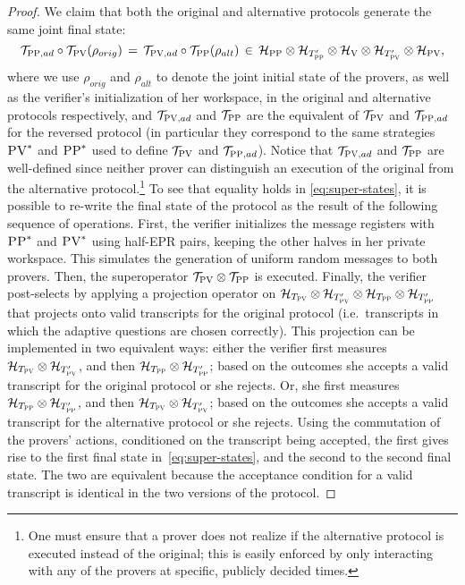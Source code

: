 \documentclass[11pt]{article}
\theoremstyle{remark}
\theoremstyle{definition}
\newcommand{\mH}{\mathcal{H}}
\newcommand{\mT}{\mathcal{T}}
\newcommand{\ver}{\textsc{V}}
\newcommand{\pv}{\textsc{PV}}
\newcommand{\pp}{\textsc{PP}}
\begin{document}
\begin{proof}
We claim that both the original and alternative protocols generate the same joint final state:
\begin{equation}\label{eq:super-states}
\mT_{\pp,ad}\circ\mT_\pv(\rho_{orig}) \,=\, \mT_{\pv,ad}\circ \mT_\pp(\rho_{alt}) \,\in\,  \mH_{\pp}\otimes \mH_{T'_{\pp}} \otimes \mH_\ver \otimes \mH_{T'_\pv} \otimes \mH_\pv,
\end{equation}
where we use $\rho_{orig}$ and $\rho_{alt}$ to denote the joint initial state
  of the provers, as well as the verifier's initialization of her workspace, in
  the original and alternative protocols respectively, and $\mT_{\pv,ad}$ and $\mT_\pp$ are the equivalent of $\mT_\pv$ and $\mT_{\pp,ad}$ for the reversed protocol (in particular they correspond to the same strategies $\pv^*$ and $\pp^*$ used to define $\mT_\pv$ and  $\mT_{\pp,ad}$). Notice that $\mT_{\pv,ad}$ and $\mT_\pp$ are well-defined since neither prover can distinguish %
an execution of the original 
from 
the alternative protocol.\footnote{One must ensure that a prover does not realize if the  alternative protocol is executed instead of the original; this is easily enforced by only interacting with any of the provers at specific, publicly decided times.}
To see that 
equality holds in \eqref{eq:super-states},
it is possible to re-write the final state of the protocol as the
  result of the following sequence of operations. First, the verifier
  initializes the message registers with $\pp^*$ and $\pv^*$ using half-EPR
  pairs, keeping the other halves in her private workspace. This simulates the
  generation of 
uniform
random messages to both provers. Then, the
  superoperator $\mT_\pv \otimes \mT_\pp$ is executed. Finally, the verifier
  post-selects by applying a projection operator on $\mH_{T_\pv} \otimes \mH_{T'_\pv} \otimes \mH_{T_\pp} \otimes \mH_{T'_\pp}$ 
that 
projects onto valid transcripts for the
  original protocol (i.e.\ transcripts in which the adaptive questions are chosen
  correctly). This projection can be implemented in two equivalent ways: either
  the verifier first measures $ \mH_{T_\pv} \otimes \mH_{T'_\pv}$, and then
  $\mH_{T_\pp} \otimes \mH_{T'_\pp}$; based on the outcomes she accepts a valid transcript for the
  original protocol or she rejects. Or, she first measures $ \mH_{T_\pp} \otimes \mH_{T'_\pp}$, and then
  $\mH_{T_\pv} \otimes \mH_{T'_\pv}$; based on the outcomes she accepts a
  valid transcript for the alternative protocol or she rejects. Using the
  commutation of the provers' actions, conditioned on the transcript being
  accepted, the first gives rise to the first final state
  in~\eqref{eq:super-states}, and the second to the second final state. The two are equivalent because the acceptance condition for a valid transcript is identical in the two versions of the protocol.



\end{proof}
\end{document}
